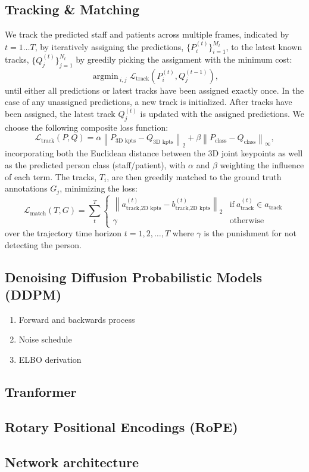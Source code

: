 \documentclass[options]{report}
\newcommand{\norm}[2]{\left \lVert #1 \right \rVert_{#2}}
\DeclareMathOperator*{\argmin}{argmin\,}
\begin{document}
\subsection*{Tracking \& Matching}
We track the predicted staff and patients across multiple frames, indicated by $t = 1 \ldots T$, by iteratively assigning the predictions, $\{ P_i^{(t)} \}_{i=1}^{M_t}$, to the latest known tracks, $\{ Q^{(t)}_{j} \}_{j=1}^{N_t}$ by greedily picking the assignment with the minimum cost:
\begin{equation}
    \argmin_{i,j} \mathcal{L}_\text{track}(P^{(t)}_i, Q^{(t-1)}_j),
\end{equation}
until either all predictions or latest tracks have been assigned exactly once. In the case of any unassigned predictions, a new track is initialized. After tracks have been assigned, the latest track $Q^{(t)}_j$ is updated with the assigned predictions. We choose the following composite loss function:
\begin{equation}
    \mathcal{L}_\text{track}(P, Q) = \alpha \norm{P_\text{3D kpts} - Q_\text{3D kpts}}{2} + \beta \norm{P_\text{class} - Q_\text{class}}{\infty},
\end{equation}
incorporating both the Euclidean distance between the 3D joint keypoints as well as the predicted person class (staff/patient), with $\alpha$ and $\beta$ weighting the influence of each term. The tracks, $T_i$, are then greedily matched to the ground truth annotations $G_j$, minimizing the loss:
\begin{equation}
    \mathcal{L}_\text{match}(T, G) = \sum_t^{T} \begin{cases}
        \norm{a^{(t)}_{\text{track}, \text{2D kpts}} - b^{(t)}_{\text{track}, \text{2D kpts}}}{2} & \text{if}\ a^{(t)}_\text{track} \in a_\text{track} \\
        \gamma & \text{otherwise}
    \end{cases}
\end{equation}
over the trajectory time horizon $t = 1,2,\ldots,T$ where $\gamma$ is the punishment for not detecting the person.



\subsection*{Denoising Diffusion Probabilistic Models (DDPM)}
\begin{enumerate}
    \item Forward and backwards process 
    \item Noise schedule
    \item ELBO derivation
\end{enumerate}

\subsection*{Tranformer}
\subsection*{Rotary Positional Encodings (RoPE)}
\subsection*{Network architecture}
\end{document}
